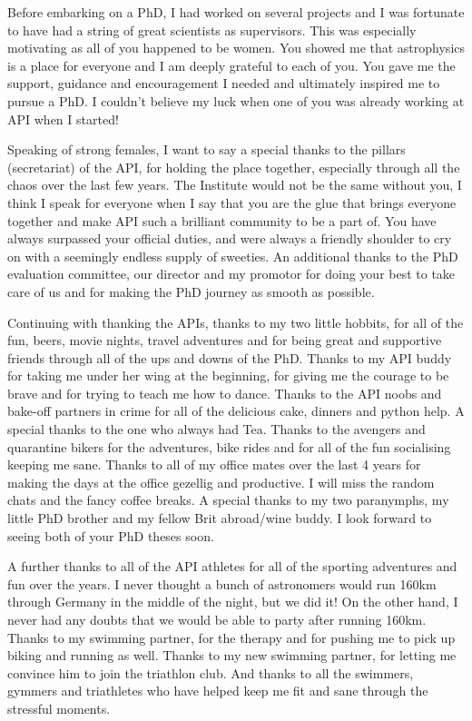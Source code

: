 Before embarking on a PhD, I had worked on several projects and I was fortunate to have had a string of great scientists as supervisors. This was especially motivating as all of you happened to be women. You showed me that astrophysics is a place for everyone and I am deeply grateful to each of you. You gave me the support, guidance and encouragement I needed and ultimately inspired me to pursue a PhD. I couldn’t believe my luck when one of you was already working at API when I started!

Speaking of strong females, I want to say a special thanks to the pillars (secretariat) of the API, for holding the place together, especially through all the chaos over the last few years. The Institute would not be the same without you, I think I speak for everyone when I say that you are the glue that brings everyone together and make API such a brilliant community to be a part of. You have always surpassed your official duties, and were always a friendly shoulder to cry on with a seemingly endless supply of sweeties. An additional thanks to the PhD evaluation committee, our director and my promotor for doing your best to take care of us and for making the PhD journey as smooth as possible.

Continuing with thanking the APIs, thanks to my two little hobbits, for all of the fun, beers, movie nights, travel adventures and for being great and supportive friends through all of the ups and downs of the PhD. Thanks to my API buddy for taking me under her wing at the beginning, for giving me the courage to be brave and for trying to teach me how to dance. Thanks to the API noobs and bake-off partners in crime for all of the delicious cake, dinners and python help. A special thanks to the one who always had Tea. Thanks to the avengers and quarantine bikers for the adventures, bike rides and for all of the fun socialising keeping me sane. Thanks to all of my office mates over the last 4 years for making the days at the office gezellig and productive. I will miss the random chats and the fancy coffee breaks. A special thanks to my two paranymphs, my little PhD brother and my fellow Brit abroad/wine buddy. I look forward to seeing both of your PhD theses soon.

A further thanks to all of the API athletes for all of the sporting adventures and fun over the years. I never thought a bunch of astronomers would run 160km through Germany in the middle of the night, but we did it! On the other hand, I never had any doubts that we would be able to party after running 160km. Thanks to my swimming partner, for the therapy and for pushing me to pick up biking and running as well. Thanks to my new swimming partner, for letting me convince him to join the triathlon club. And thanks to all the swimmers, gymmers and triathletes who have helped keep me fit and sane through the stressful moments.


